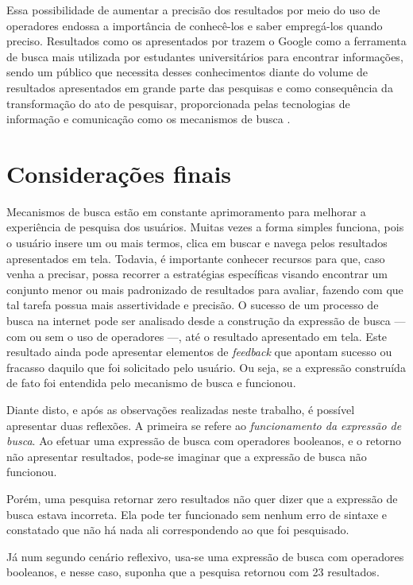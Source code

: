 \documentclass[portuguese]{textolivre}
\begin{document}
Essa possibilidade de aumentar a precisão dos resultados por meio do uso de operadores endossa a importância de conhecê-los e saber empregá-los quando preciso. Resultados como os apresentados por \textcite{mnguni_web_2022} trazem o Google como a ferramenta de busca mais utilizada por estudantes universitários para encontrar informações, sendo um público que necessita desses conhecimentos diante do volume de resultados apresentados em grande parte das pesquisas e como consequência da transformação do ato de pesquisar, proporcionada pelas tecnologias de informação e comunicação como os mecanismos de busca \cite{gonzalez_guitian_comportamiento_2022}.

\section{Considerações finais}\label{sec-listas}
Mecanismos de busca estão em constante aprimoramento para melhorar a experiência de pesquisa dos usuários. Muitas vezes a forma simples funciona, pois o usuário insere um ou mais termos, clica em buscar e navega pelos resultados apresentados em tela. Todavia, é importante conhecer recursos para que, caso venha a precisar, possa recorrer a estratégias específicas visando encontrar um conjunto menor ou mais padronizado de resultados para avaliar, fazendo com que tal tarefa possua mais assertividade e precisão. 	
O sucesso de um processo de busca na internet pode ser analisado desde a construção da expressão de busca — com ou sem o uso de operadores —, até o resultado apresentado em tela. Este resultado ainda pode apresentar elementos de \textit{feedback} que apontam sucesso ou fracasso daquilo que foi solicitado pelo usuário. Ou seja, se a expressão construída de fato foi entendida pelo mecanismo de busca e funcionou.

Diante disto, e após as observações realizadas neste trabalho, é possível apresentar duas reflexões. A primeira se refere ao \textit{funcionamento da expressão de busca}. Ao efetuar uma expressão de busca com operadores booleanos, e o retorno não apresentar resultados, pode-se imaginar que a expressão de busca não funcionou.

Porém, uma pesquisa retornar zero resultados não quer dizer que a expressão de busca estava incorreta. Ela pode ter funcionado sem nenhum erro de sintaxe e constatado que não há nada ali correspondendo ao que foi pesquisado.

Já num segundo cenário reflexivo, usa-se uma expressão de busca com operadores booleanos, e nesse caso, suponha que a pesquisa retornou com 23 resultados.
\end{document}
